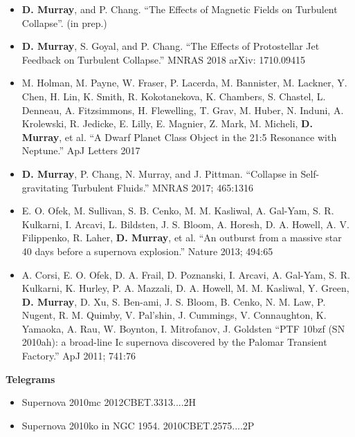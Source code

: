 \documentclass[12pt,notitlepage]{report}
\begin{document}
\begin{itemize}


\item[] \textbf{D. Murray}, and P. Chang. ``The Effects of Magnetic Fields on Turbulent Collapse''. (in prep.)

\item[] \textbf{D. Murray}, S. Goyal, and P. Chang. ``The Effects of Protostellar Jet Feedback on Turbulent Collapse.'' MNRAS 2018 arXiv: 1710.09415

\item[] M. Holman, M. Payne, W. Fraser, P. Lacerda, M. Bannister, M. Lackner, Y. Chen, H. Lin, K. Smith, R. Kokotanekova, K. Chambers, S. Chastel, L. Denneau, A. Fitzsimmons, H. Flewelling, T. Grav, M. Huber, N. Induni, A. Krolewski, R. Jedicke, E. Lilly, E. Magnier, Z. Mark, M. Micheli, \textbf{D. Murray}, et al. ``A Dwarf Planet Class Object in the 21:5 Resonance with Neptune.'' ApJ Letters 2017 %

\item[] \textbf{D. Murray}, P. Chang, N. Murray, and J. Pittman. ``Collapse in Self-gravitating Turbulent Fluids.'' MNRAS 2017; 465:1316

\item[] E. O. Ofek, M. Sullivan, S. B. Cenko, M. M.  Kasliwal, A. Gal-Yam, S. R. Kulkarni, I. Arcavi, L. Bildsten, J. S. Bloom, A. Horesh, D. A. Howell, A. V. Filippenko, R. Laher, \textbf{D. Murray}, et al. ``An outburst from a massive star 40 days before a supernova explosion.'' Nature 2013; 494:65

\item[] A. Corsi, E. O. Ofek, D. A. Frail, D. Poznanski, I. Arcavi, A. Gal-Yam, S. R. Kulkarni, K. Hurley, P. A. Mazzali, D. A. Howell, M. M. Kasliwal, Y. Green, \textbf{D. Murray}, D. Xu, S. Ben-ami, J. S. Bloom, B. Cenko, N. M. Law, P. Nugent, R. M. Quimby, V. Pal'shin, J. Cummings, V. Connaughton, K. Yamaoka, A. Rau, W. Boynton, I. Mitrofanov, J. Goldsten ``PTF 10bzf (SN 2010ah): a broad-line Ic supernova discovered by the Palomar Transient Factory.'' ApJ 2011; 741:76

\end{itemize}

\textbf{Telegrams}

\begin{itemize}

\item[] Supernova 2010mc 2012CBET.3313....2H

\item[] Supernova 2010ko in NGC 1954. 2010CBET.2575....2P

\end{itemize}
\end{document}
